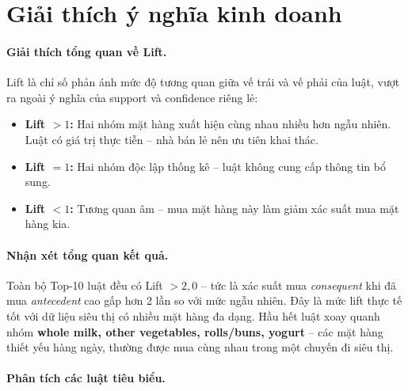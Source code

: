 \documentclass[12pt,a4paper]{report}
\begin{document}
\section{Giải thích ý nghĩa kinh doanh}

\paragraph{Giải thích tổng quan về Lift.}
Lift là chỉ số phản ánh mức độ tương quan giữa vế trái và vế phải của luật, vượt
ra ngoài ý nghĩa của support và confidence riêng lẻ:
\begin{itemize}
    \item \textbf{Lift $> 1$:} Hai nhóm mặt hàng xuất hiện cùng nhau nhiều hơn
          ngẫu nhiên. Luật có giá trị thực tiễn -- nhà bán lẻ nên ưu tiên khai thác.
    \item \textbf{Lift $= 1$:} Hai nhóm độc lập thống kê -- luật không cung cấp
          thông tin bổ sung.
    \item \textbf{Lift $< 1$:} Tương quan âm -- mua mặt hàng này làm giảm xác suất
          mua mặt hàng kia.
\end{itemize}

\paragraph{Nhận xét tổng quan kết quả.}
Toàn bộ Top-10 luật đều có Lift $> 2{,}0$ -- tức là xác suất mua \textit{consequent}
khi đã mua \textit{antecedent} cao gấp hơn 2 lần so với mức ngẫu nhiên. Đây là mức
lift thực tế tốt với dữ liệu siêu thị có nhiều mặt hàng đa dạng. Hầu hết luật
xoay quanh nhóm \textbf{whole milk, other vegetables, rolls/buns, yogurt} -- các
mặt hàng thiết yếu hàng ngày, thường được mua cùng nhau trong một chuyến đi siêu thị.

\paragraph{Phân tích các luật tiêu biểu.}
\end{document}
